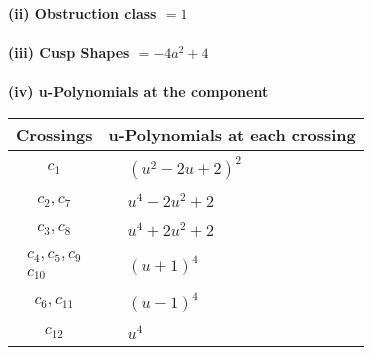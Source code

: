 \documentclass[1p]{elsarticle_modified}
\theoremstyle{definition}
\begin{document}
\flushleft \textbf{(ii) Obstruction class $= 1$}\\~\\
\flushleft \textbf{(iii) Cusp Shapes $= -4 a^2+4$}\\~\\
\newpage\renewcommand{\arraystretch}{1}
\flushleft \textbf{(iv) u-Polynomials at the component}\newline \\
\begin{tabular}{m{50pt}|m{274pt}}
Crossings & \hspace{64pt}u-Polynomials at each crossing \\
\hline $$\begin{aligned}c_{1}\end{aligned}$$&$\begin{aligned}
&(u^2-2 u+2)^2
\end{aligned}$\\
\hline $$\begin{aligned}c_{2},c_{7}\end{aligned}$$&$\begin{aligned}
&u^4-2 u^2+2
\end{aligned}$\\
\hline $$\begin{aligned}c_{3},c_{8}\end{aligned}$$&$\begin{aligned}
&u^4+2 u^2+2
\end{aligned}$\\
\hline $$\begin{aligned}c_{4},c_{5},c_{9}\\c_{10}\end{aligned}$$&$\begin{aligned}
&(u+1)^4
\end{aligned}$\\
\hline $$\begin{aligned}c_{6},c_{11}\end{aligned}$$&$\begin{aligned}
&(u-1)^4
\end{aligned}$\\
\hline $$\begin{aligned}c_{12}\end{aligned}$$&$\begin{aligned}
&u^4
\end{aligned}$\\
\hline
\end{tabular}\\~\\
\end{document}
